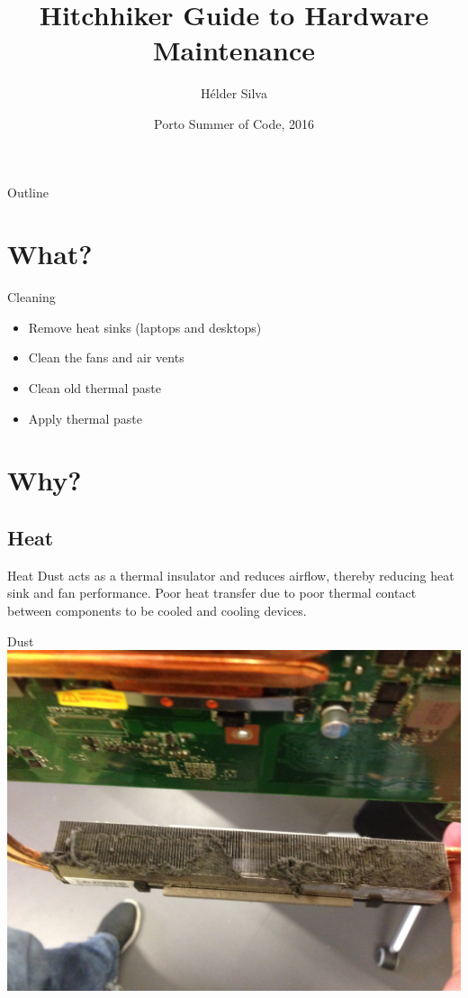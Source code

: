 \documentclass{beamer}
\title{Hitchhiker Guide to Hardware Maintenance}
\author{Hélder Silva}
\date{Porto Summer of Code, 2016}
\begin{document}
\begin{frame}
  \titlepage
\end{frame}

\begin{frame}{Outline}
  \tableofcontents
\end{frame}

\section{What?}

\begin{frame}{Cleaning}
    \begin{itemize}
        \item Remove heat sinks (laptops and desktops)
        \item Clean the fans and air vents
        \item Clean old thermal paste
        \item Apply thermal paste
    \end{itemize}
\end{frame}

\section{Why?}

\subsection{Heat}
\begin{frame}{Heat}
    Dust acts as a thermal insulator and reduces airflow, thereby reducing heat sink and fan performance.
    \newline
    \newline
    Poor heat transfer due to poor thermal contact between components to be cooled and cooling devices.
\end{frame}

\begin{frame}{Dust}
    \centering
    \includegraphics[scale=0.08]{dust}
\end{frame}
\end{document}
